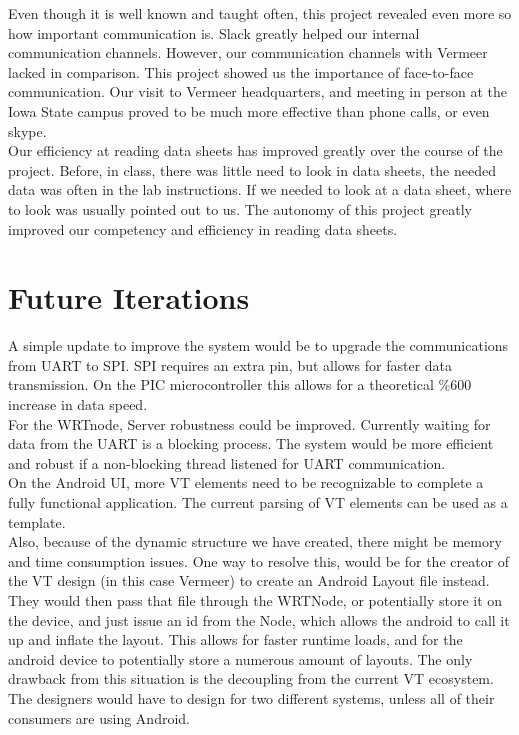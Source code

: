 \documentclass[paper=a4, fontsize=11pt]{scrartcl}
\numberwithin{equation}{section}		%
\numberwithin{figure}{section}			%
\numberwithin{table}{section}				%
\begin{document}
Even though it is well known and taught often, this project revealed even more so how important communication is. Slack greatly helped our internal communication channels. However, our communication channels with Vermeer lacked in comparison. This project showed us the importance of face-to-face communication. Our visit to Vermeer headquarters, and meeting in person at the Iowa State campus proved to be much more effective than phone calls, or even skype.\\

Our efficiency at reading data sheets has improved greatly over the course of the project. Before, in class, there was little need to look in data sheets, the needed data was often in the lab instructions. If we needed to look at a data sheet, where to look was usually pointed out to us. The autonomy of this project greatly improved our competency and efficiency in reading data sheets.\\

\pagebreak
\section{Future Iterations}
A simple update to improve the system would be to upgrade the communications from UART to SPI. SPI requires an extra pin, but allows for faster data transmission. On the PIC microcontroller this allows for a theoretical \%600 increase in data speed. \\

For the WRTnode, Server robustness could be improved. Currently waiting for data from the UART is a blocking process. The system would be more efficient and robust if a non-blocking thread listened for UART communication. \\

On the Android UI, more VT elements need to be recognizable to complete a fully functional application. The current parsing of VT elements can be used as a template.\\

Also, because of the dynamic structure we have created, there might be memory and time consumption issues. One way to resolve this, would be for the creator of the VT design (in this case Vermeer) to create an Android Layout file instead. They would then pass that file through the WRTNode, or potentially store it on the device, and just issue an id from the Node, which allows the android to call it up and inflate the layout. This allows for faster runtime loads, and for the android device to potentially store a numerous amount of layouts. The only drawback from this situation is the decoupling from the current VT ecosystem. The designers would have to design for two different systems, unless all of their consumers are using Android.
\end{document}
